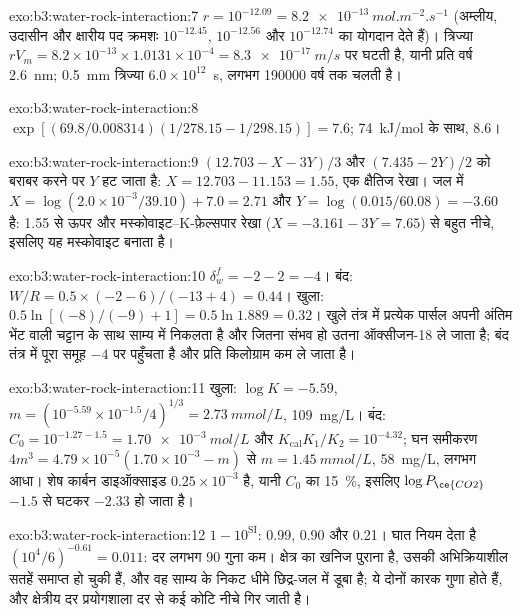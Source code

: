\begin{solution}{exo:b3:water-rock-interaction:7}
$r = 10^{-12.09} = \qty{8.2e-13}{mol.m^{-2}.s^{-1}}$ (अम्लीय, उदासीन और
क्षारीय पद क्रमशः $10^{-12.45}$, $10^{-12.56}$ और $10^{-12.74}$ का योगदान देते हैं)। त्रिज्या
$rV_m = 8.2\times10^{-13}\times1.0131\times10^{-4} =
\qty{8.3e-17}{m/s}$ पर घटती है, यानी प्रति वर्ष \qty{2.6}{nm}; \qty{0.5}{mm} त्रिज्या
$6.0\times10^{12}$~s, लगभग \num{190000} वर्ष तक चलती है।
\end{solution}

\begin{solution}{exo:b3:water-rock-interaction:8}
$\exp[(69.8/0.008314)(1/278.15 - 1/298.15)] = 7.6$; \qty{74}{kJ/mol}
के साथ, 8.6।
\end{solution}

\begin{solution}{exo:b3:water-rock-interaction:9}
$(12.703 - X - 3Y)/3$ और $(7.435 - 2Y)/2$ को बराबर करने पर $Y$ हट जाता है: $X =
12.703 - 11.153 = 1.55$, एक क्षैतिज रेखा। जल में $X = \log(2.0\times
10^{-3}/39.10) + 7.0 = 2.71$ और $Y = \log(0.015/60.08) = -3.60$ है: 1.55 से ऊपर
और मस्कोवाइट--K-फ़ेल्सपार रेखा ($X = -3.161 - 3Y = 7.65$) से बहुत नीचे,
इसलिए यह मस्कोवाइट बनाता है।
\end{solution}

\begin{solution}{exo:b3:water-rock-interaction:10}
$\delta_w^f = -2 - 2 = -4$। बंद: $W/R = 0.5\times(-2 - 6)/(-13 + 4) =
0.44$। खुला: $0.5\ln[(-8)/(-9) + 1] = 0.5\ln1.889 = 0.32$। खुले तंत्र में प्रत्येक
पार्सल अपनी अंतिम भेंट वाली चट्टान के साथ साम्य में निकलता है और जितना संभव हो उतना
ऑक्सीजन-18 ले जाता है; बंद तंत्र में पूरा समूह $-4$ पर पहुँचता है और
प्रति किलोग्राम कम ले जाता है।
\end{solution}

\begin{solution}{exo:b3:water-rock-interaction:11}
खुला: $\log K = -5.59$, $m = (10^{-5.59}\times10^{-1.5}/4)^{1/3} =
\qty{2.73}{mmol/L}$, \qty{109}{mg/L}। बंद: $C_0 = 10^{-1.27 - 1.5} =
\qty{1.70e-3}{mol/L}$ और $K_{\mathrm{cal}}K_1/K_2 = 10^{-4.32}$; घन समीकरण
$4m^3 = 4.79\times10^{-5}(1.70\times10^{-3} - m)$ से $m =
\qty{1.45}{mmol/L}$, \qty{58}{mg/L}, लगभग आधा। शेष कार्बन डाइऑक्साइड
$0.25\times10^{-3}$ है, यानी $C_0$ का \qty{15}{\percent}, इसलिए $\log P_{\ce{CO2}}$
$-1.5$ से घटकर $-2.33$ हो जाता है।
\end{solution}

\begin{solution}{exo:b3:water-rock-interaction:12}
$1 - 10^{\mathrm{SI}}$: 0.99, 0.90 और 0.21। घात नियम देता है
$(10^4/6)^{-0.61} = 0.011$: दर लगभग 90 गुना कम। क्षेत्र का खनिज
पुराना है, उसकी अभिक्रियाशील सतहें समाप्त हो चुकी हैं, और वह साम्य के निकट धीमे छिद्र-जल
में डूबा है; ये दोनों कारक गुणा होते हैं, और क्षेत्रीय दर प्रयोगशाला दर से
कई कोटि नीचे गिर जाती है।
\end{solution}

